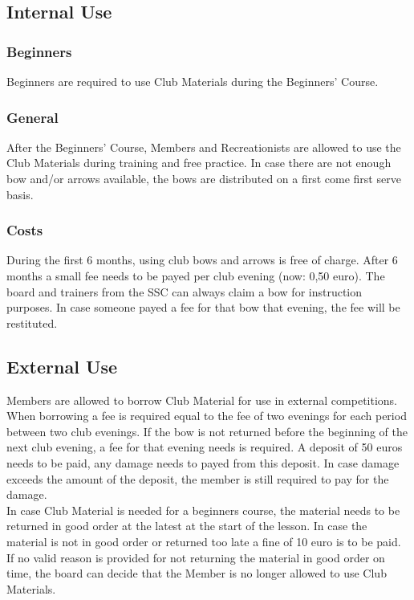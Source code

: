\documentclass[a4paper]{article}
\begin{document}
\subsection{Internal Use}
\subsubsection{Beginners}
Beginners are required to use Club Materials during the Beginners' Course.

\subsubsection{General}
After the Beginners' Course, Members and Recreationists are allowed to use the Club Materials during training and free practice. In case there are not enough bow and/or arrows available, the bows are distributed on a first come first serve basis.

\subsubsection{Costs}
During the first 6 months, using club bows and arrows is free of charge. After 6 months a small fee needs to be payed per club evening (now: 0,50 euro). The board and trainers from the SSC can always claim a bow for instruction purposes. In case someone payed a fee for that bow that evening, the fee will be restituted.

\subsection{External Use}
Members are allowed to borrow Club Material for use in external competitions. When borrowing a fee is required equal to the fee of two evenings for each period between two club evenings. If the bow is not returned before the beginning of the next club evening, a fee for that evening needs is required. A deposit of 50 euros needs to be paid, any damage needs to payed from this deposit. In case damage exceeds the amount of the deposit, the member is still required to pay for the damage. \\

In case Club Material is needed for a beginners course, the material needs to be returned in good order at the latest at the start of the lesson. In case the material is not in good order or returned too late a fine of 10 euro is to be paid. If no valid reason is provided for not returning the material in good order on time, the board can decide that the Member is no longer allowed to use Club Materials.
\end{document}
